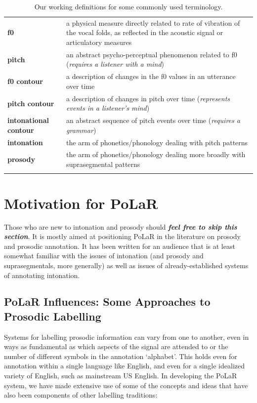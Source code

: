 \documentclass[11pt, twoside]{memoir}
\begin{document}
\begin{longtable}{>{\bfseries}p{.175\linewidth}p{.75\linewidth}} \endhead\toprule 
f0 &
a physical measure directly related to rate of vibration of the vocal folds, as reflected in the acoustic signal or articulatory measures
\tabularnewline\hdashline
pitch &
an abstract psycho-perceptual phenomenon related to f0 (\textit{requires a listener with a mind})
\tabularnewline\hdashline
f0 contour &
a description of changes in the f0 values in an utterance over time
\tabularnewline\hdashline
pitch contour &
a description of changes in pitch over time (\textit{represents events in a listener’s mind})
\tabularnewline\hdashline
intonational contour &
an abstract sequence of pitch events over time (\textit{requires a grammar})
\tabularnewline\hdashline
intonation &
the arm of phonetics\slash phonology dealing with pitch patterns
\tabularnewline\hdashline
prosody &
the arm of phonetics\slash phonology dealing more broadly with suprasegmental patterns
\tabularnewline\bottomrule 
\caption{Our working definitions for some commonly used terminology.
\label{tab:terminology}
}
\end{longtable}


\section{Motivation for PoLaR}
Those who are new to intonation and prosody should \textit{\textbf{feel free to skip this section}}. It is mostly aimed at positioning PoLaR in the literature on prosody and prosodic annotation. It has been written for an audience that is at least somewhat familiar with the issues of intonation (and prosody and suprasegmentals, more generally) as well as issues of already-established systems of annotating intonation.

\subsection{PoLaR Influences: Some Approaches to Prosodic Labelling}\label{sec:past-approaches-to-prosodic-labelling}

Systems for labelling prosodic information can vary from one to another, even in ways as fundamental as which aspects of the signal are attended to or the number of different symbols in the annotation ‘alphabet’. This holds even for annotation within a single language like English, and even for a single idealized variety of English, such as mainstream US English. In developing the PoLaR system, we have made extensive use of some of the concepts and ideas that have also been components of other labelling traditions:
\end{document}
